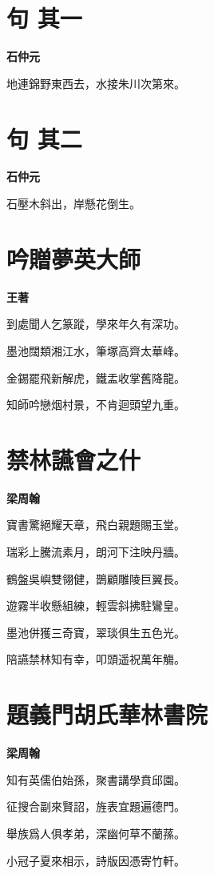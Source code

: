 \documentclass[12pt,a4paper]{ctexbook}
\begin{document}
\section{句  其一}
\textbf{石仲元}\par\vspace{0.5em}
地連錦野東西去，水接朱川次第來。\par

\section{句  其二}
\textbf{石仲元}\par\vspace{0.5em}
石壓木斜出，岸懸花倒生。\par

\section{吟贈夢英大師}
\textbf{王著}\par\vspace{0.5em}
到處聞人乞篆蹤，學來年久有深功。\par
墨池闊類湘江水，筆塚高齊太華峰。\par
金錫罷飛新解虎，鐵盂收掌舊降龍。\par
知師吟戀烟村景，不肯迴頭望九重。\par

\section{禁林讌會之什}
\textbf{梁周翰}\par\vspace{0.5em}
寶書驚絕耀天章，飛白親題賜玉堂。\par
瑞彩上騰流素月，朗河下注映丹牆。\par
鶴盤吳嶼雙翎健，鵲顧雕陵巨翼長。\par
遊霧半收懸組練，輕雲斜拂駐鸞皇。\par
墨池併獲三奇寶，翠琰俱生五色光。\par
陪讌禁林知有幸，叩頭遥祝萬年觴。\par

\section{題義門胡氏華林書院}
\textbf{梁周翰}\par\vspace{0.5em}
知有英儒伯始孫，聚書講學賁邱園。\par
征搜合副來賢詔，旌表宜題遍德門。\par
舉族爲人俱孝弟，深幽何草不蘭蓀。\par
小冠子夏來相示，詩版因憑寄竹軒。\par
\end{document}
